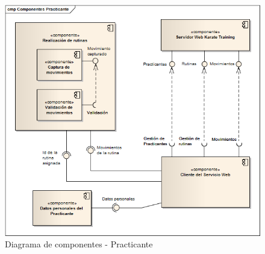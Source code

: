 \clearpage

\begin{figure}[H]
	\begin{center}
		\includegraphics[scale=0.8]{./Figuras/Arquitectura/Componentes_Practicante}
	\end{center}
	\caption{Diagrama de componentes - Practicante}
	\label{fig:Co_Practicante}
\end{figure}

\clearpage